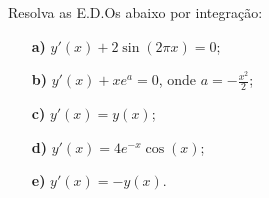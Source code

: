 \linespread{1.5}
Resolva as E.D.Os abaixo por integração:
{\large \begin{itemize}
    \item[\textbf{a)}] $y'(x) + 2\sin{(2\pi x)} = 0$;
    \item[\textbf{b)}] $y'(x) + xe^a = 0$, onde $a=-\frac{x^2}{2}$;
    \item[\textbf{c)}] $y'(x) = y(x)$;
    \item[\textbf{d)}] $y'(x) = 4e^{-x}\cos{(x)}$;
    \item[\textbf{e)}] $y'(x) = -y(x)$.
\end{itemize}}